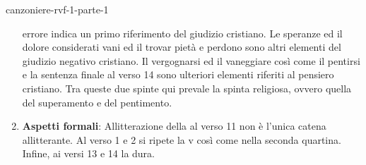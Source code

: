 \documentclass[preview]{standalone}
\begin{document}
\begin{snippet}{canzoniere-rvf-1-parte-1}
\begin{enumerate}
            errore indica un primo riferimento del giudizio cristiano. Le speranze ed il dolore considerati vani ed
            il trovar pietà e perdono sono altri elementi del giudizio negativo cristiano. Il vergognarsi ed il
            vaneggiare così come il pentirsi e la sentenza finale al verso 14 sono ulteriori elementi riferiti al
            pensiero cristiano. Tra queste due spinte qui prevale la spinta religiosa, ovvero quella del
            superamento e del pentimento.
        \item \textbf{Aspetti formali}:
            Allitterazione della  al verso 11 non è l'unica catena allitterante. Al verso 1 e 2 si ripete la v
            così come nella seconda quartina. Infine, ai versi 13 e 14 la  dura.
    \end{enumerate}
\end{snippet}
\end{document}
